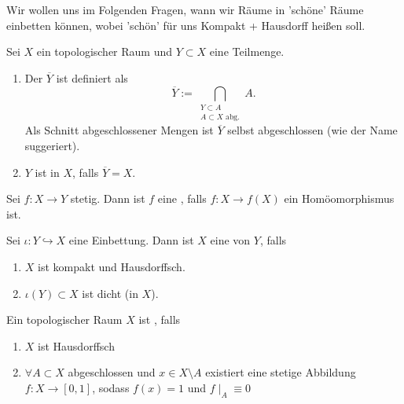 \begin{goal}[mündlich]
    Wir wollen uns im Folgenden Fragen, wann wir Räume in 'schöne' Räume einbetten können, wobei 'schön' für uns Kompakt + Hausdorff heißen soll.
\end{goal}

\begin{definition} \label{def:abschluss-dichtheit}
    Sei $X$ ein topologischer Raum und $Y\subset X$ eine Teilmenge.
    \begin{enumerate}[1)]
        \item Der  $\overline{Y}$ ist definiert als
            \[
            \overline{Y} := \bigcap_{\substack{Y\subset A \\ A\subset X \text{ abg.}} } A
            .\] 
            Als Schnitt abgeschlossener Mengen ist $\overline{Y}$ selbst abgeschlossen (wie der Name suggeriert).
        \item  $Y$ ist  in $X$, falls  $\overline{Y} = X$.
    \end{enumerate}
\end{definition}
\begin{definition}[Einbettung]\label{def:einbettung}
    Sei $f:X\to Y$ stetig. Dann ist $f$ eine  , falls $f: X \to  f(X)$ ein Homöomorphismus ist.
\end{definition}
\begin{definition}[Kompaktifizierung] \label{def:kompaktifizierung}
    Sei $ι: Y\hookrightarrow X$ eine Einbettung. Dann ist $X$ eine  von $Y$, falls
    \begin{enumerate}[1)]
        \item $X$ ist kompakt und Hausdorffsch.
        \item  $ι(Y)\subset X$ ist dicht (in $X$).
    \end{enumerate}
\end{definition}
\begin{definition}\label{def:vollständig-regulär}
    Ein topologischer Raum $X$ ist  , falls
    \begin{enumerate}[1)]
        \item $X$ ist Hausdorffsch
        \item  $\forall A\subset X$ abgeschlossen und $x\in X\setminus A$ existiert eine stetige Abbildung $f:X \to  [0,1]$, sodass $f(x) = 1$ und  $f\mid _A \equiv 0$
    \end{enumerate}
\end{definition}
